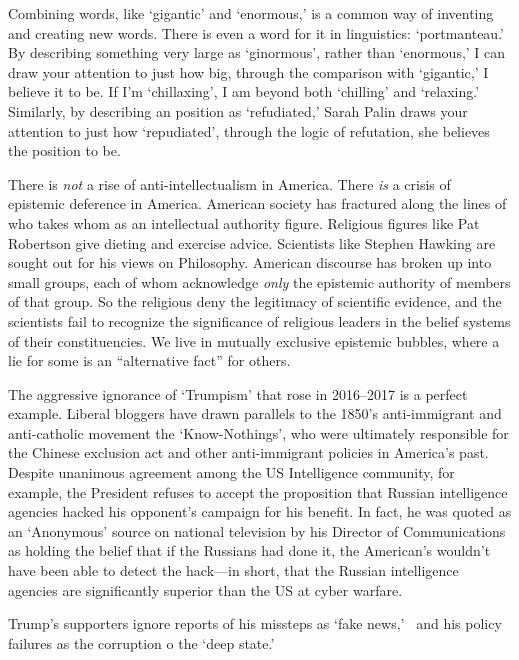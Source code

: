 Combining words, like `gigantic' and `enormous,' is a common way of inventing and creating new words. There is even a word for it in linguistics: `portmanteau.' By describing something very large as `ginormous', rather than `enormous,' I can draw your attention to just how big, through the comparison with `gigantic,' I believe it to be. If I'm `chillaxing', I am beyond both `chilling' and `relaxing.' Similarly, by describing an position as `refudiated,' Sarah Palin draws your attention to just how `repudiated', through the logic of refutation, she believes the position to be.

There is \emph{not} a rise of anti-intellectualism in America. There \emph{is} a crisis of epistemic deference in America. American society has fractured along the lines of who takes whom as an intellectual authority figure. Religious figures like Pat Robertson give dieting and exercise advice. Scientists like Stephen Hawking are sought out for his views on Philosophy. American discourse has broken up into small groups, each of whom acknowledge \emph{only} the epistemic authority of members of that group. So the religious deny the legitimacy of scientific evidence, and the scientists fail to recognize the significance of religious leaders in the belief systems of their constituencies. We live in mutually exclusive epistemic bubbles, where a lie for some is an ``alternative fact'' for others. ~\citep{Bradner:2017tg}

The aggressive ignorance of `Trumpism' that rose in 2016--2017 is a perfect example. Liberal bloggers have drawn parallels to the 1850's anti-immigrant and anti-catholic movement the `Know-Nothings', who were ultimately responsible for the Chinese exclusion act and other anti-immigrant policies in America's past. ~\citep{Anonymous:2016ux} Despite unanimous agreement among the US Intelligence community, for example, the President refuses to accept the proposition that Russian intelligence agencies hacked his opponent's campaign for his benefit. In fact, he was quoted as an `Anonymous' source on national television by his Director of Communications as holding the belief that if the Russians had done it, the American's wouldn't have been able to detect the hack---in short, that the Russian intelligence agencies are significantly superior than the US at cyber warfare.~\citep{Beavers:2017wv}

Trump's supporters ignore reports of his missteps as `fake news,'~\citep{Maizland:2017tr} and his policy failures as the corruption o the `deep state.' ~\citep{Kilgore:2017ux}

